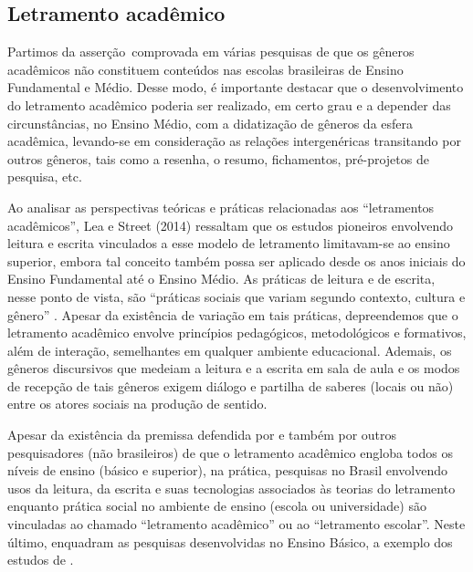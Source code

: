 \documentclass{textolivre}
\begin{document}
\subsection{Letramento acadêmico}\label{sec-fmt-academica}
Partimos da asserção comprovada em várias pesquisas de que os gêneros acadêmicos não constituem conteúdos nas escolas brasileiras de Ensino Fundamental e Médio. Desse modo, é importante destacar que o desenvolvimento do letramento acadêmico poderia ser realizado, em certo grau e a depender das circunstâncias, no Ensino Médio, com a didatização de gêneros da esfera acadêmica, levando-se em consideração as relações intergenéricas \cite{correa_relacoes_2006} transitando por outros gêneros, tais como a resenha, o resumo, fichamentos, pré-projetos de pesquisa, etc.

Ao analisar as perspectivas teóricas e práticas relacionadas aos “letramentos acadêmicos”, Lea e Street (2014) ressaltam que os estudos pioneiros envolvendo leitura e escrita vinculados a esse modelo de letramento limitavam-se ao ensino superior, embora tal conceito também possa ser aplicado desde os anos iniciais do Ensino Fundamental até o Ensino Médio. As práticas de leitura e de escrita, nesse ponto de vista, são “práticas sociais que variam segundo contexto, cultura e gênero” \cite[p. 477]{komesu_o_2014}. Apesar da existência de variação em tais práticas, depreendemos que o letramento acadêmico envolve princípios pedagógicos, metodológicos e formativos, além de interação, semelhantes em qualquer ambiente educacional. Ademais, os gêneros discursivos que medeiam a leitura e a escrita em sala de aula e os modos de recepção de tais gêneros exigem diálogo e partilha de saberes (locais ou não) entre os atores sociais na produção de sentido.

Apesar da existência da premissa defendida por \textcite{komesu_o_2014} e também por outros pesquisadores (não brasileiros) de que o letramento acadêmico engloba todos os níveis de ensino (básico e superior), na prática, pesquisas no Brasil envolvendo usos da leitura, da escrita e suas tecnologias associados às teorias do letramento enquanto prática social no ambiente de ensino (escola ou universidade) são vinculadas ao chamado “letramento acadêmico” ou ao “letramento escolar”. Neste último, enquadram as pesquisas desenvolvidas no Ensino Básico, a exemplo dos estudos de \textcite{silva_pedagogia_2018, silva_plano_2020}.
\end{document}
